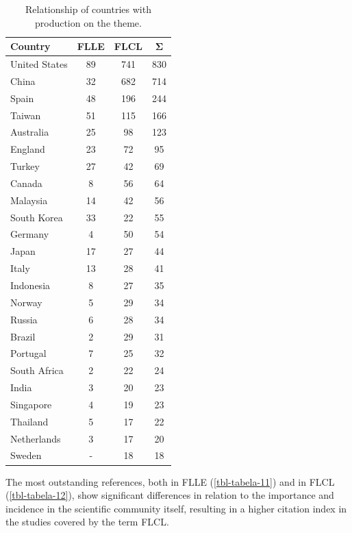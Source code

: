 \documentclass{textolivre-html}
\begin{document}
\begin{table}[htpb]
\caption{Relationship of countries with production on the theme.}
\label{tbl-tabela-10}
\centering
\begin{tabular}{lccc}
\toprule
\textbf{Country} & \textbf{FLLE} & \textbf{FLCL} & \textbf{Σ} \\
\midrule
United States & 89 & 741 & 830 \\ 
China         & 32 & 682 & 714 \\ 
Spain         & 48 & 196 & 244 \\ 
Taiwan        & 51 & 115 & 166 \\ 
Australia     & 25 & 98  & 123 \\ 
England       & 23 & 72  & 95  \\ 
Turkey        & 27 & 42  & 69  \\ 
Canada        & 8  & 56  & 64  \\ 
Malaysia      & 14 & 42  & 56  \\ 
South Korea   & 33 & 22  & 55  \\ 
Germany       & 4  & 50  & 54  \\ 
Japan         & 17 & 27  & 44  \\ 
Italy         & 13 & 28  & 41  \\ 
Indonesia     & 8  & 27  & 35  \\ 
Norway        & 5  & 29  & 34  \\ 
Russia        & 6  & 28  & 34  \\ 
Brazil        & 2  & 29  & 31  \\ 
Portugal      & 7  & 25  & 32  \\ 
South Africa  & 2  & 22  & 24  \\ 
India         & 3  & 20  & 23  \\ 
Singapore     & 4  & 19  & 23  \\ 
Thailand      & 5  & 17  & 22  \\ 
Netherlands   & 3  & 17  & 20  \\ 
Sweden        & -  & 18  & 18  \\ 
\bottomrule
\end{tabular}
\end{table}

The most outstanding references, both in FLLE (\cref{tbl-tabela-11}) and in FLCL (\cref{tbl-tabela-12}), show significant differences in relation to the importance and incidence in the scientific community itself, resulting in a higher citation index in the studies covered by the term FLCL.
\end{document}
